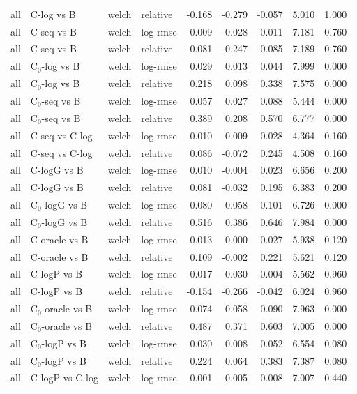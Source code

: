 \begin{longtable}{llllrrrrr}
all & C-log vs B & welch & relative & -0.168 & -0.279 & -0.057 & 5.010 & 1.000 \\
all & C-seq vs B & welch & log-rmse & -0.009 & -0.028 & 0.011 & 7.181 & 0.760 \\
all & C-seq vs B & welch & relative & -0.081 & -0.247 & 0.085 & 7.189 & 0.760 \\
all & C$_0$-log vs B & welch & log-rmse & 0.029 & 0.013 & 0.044 & 7.999 & 0.000 \\
all & C$_0$-log vs B & welch & relative & 0.218 & 0.098 & 0.338 & 7.575 & 0.000 \\
all & C$_0$-seq vs B & welch & log-rmse & 0.057 & 0.027 & 0.088 & 5.444 & 0.000 \\
all & C$_0$-seq vs B & welch & relative & 0.389 & 0.208 & 0.570 & 6.777 & 0.000 \\
all & C-seq vs C-log & welch & log-rmse & 0.010 & -0.009 & 0.028 & 4.364 & 0.160 \\
all & C-seq vs C-log & welch & relative & 0.086 & -0.072 & 0.245 & 4.508 & 0.160 \\
all & C-logG vs B & welch & log-rmse & 0.010 & -0.004 & 0.023 & 6.656 & 0.200 \\
all & C-logG vs B & welch & relative & 0.081 & -0.032 & 0.195 & 6.383 & 0.200 \\
all & C$_0$-logG vs B & welch & log-rmse & 0.080 & 0.058 & 0.101 & 6.726 & 0.000 \\
all & C$_0$-logG vs B & welch & relative & 0.516 & 0.386 & 0.646 & 7.984 & 0.000 \\
all & C-oracle vs B & welch & log-rmse & 0.013 & 0.000 & 0.027 & 5.938 & 0.120 \\
all & C-oracle vs B & welch & relative & 0.109 & -0.002 & 0.221 & 5.621 & 0.120 \\
all & C-logP vs B & welch & log-rmse & -0.017 & -0.030 & -0.004 & 5.562 & 0.960 \\
all & C-logP vs B & welch & relative & -0.154 & -0.266 & -0.042 & 6.024 & 0.960 \\
all & C$_0$-oracle vs B & welch & log-rmse & 0.074 & 0.058 & 0.090 & 7.963 & 0.000 \\
all & C$_0$-oracle vs B & welch & relative & 0.487 & 0.371 & 0.603 & 7.005 & 0.000 \\
all & C$_0$-logP vs B & welch & log-rmse & 0.030 & 0.008 & 0.052 & 6.554 & 0.080 \\
all & C$_0$-logP vs B & welch & relative & 0.224 & 0.064 & 0.383 & 7.387 & 0.080 \\
all & C-logP vs C-log & welch & log-rmse & 0.001 & -0.005 & 0.008 & 7.007 & 0.440 \\

\end{longtable}
